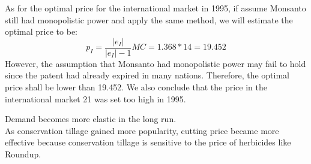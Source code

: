 \documentclass[a4paper]{article}
\begin{document}
\begin{answer}[Q2]
    As for the optimal price for the international market in 1995, if assume Monsanto still had monopolistic power and apply the same method, we will estimate the optimal price to be:
    \begin{equation*}
        p_I = \frac{|e_I|}{|e_I|-1} MC = 1.368 * 14 = 19.452
    \end{equation*}
    However, the assumption that Monsanto had monopolistic power may fail to hold since the patent had already expired in many nations. Therefore, the optimal price shall be lower than 19.452. We also conclude that the price in the international market 21 was set too high in 1995.
    
    \end{answer}
    \begin{answer}[Q3]
    Demand becomes more elastic in the long run. \\
    As conservation tillage gained more popularity, cutting price became more effective because conservation tillage is sensitive to the price of herbicides like Roundup.
    \end{answer}
\end{document}
